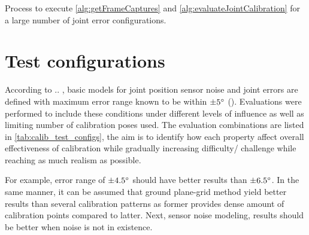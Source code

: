 \documentclass[english, printversion, nomenclature, notitle]{tuvisionthesis} %
\makeatletter
\renewcommand{\todo}[2][]{\tikzexternaldisable\@todo[#1]{#2}\tikzexternalenable}
\makeatother
\begin{document}
\begin{algorithm}[H]
	\caption{Process to execute \cref{alg:getFrameCaptures} and \cref{alg:evaluateJointCalibration} for a large number of joint error configurations.}	\label{alg:EvaluateCalibrationPoses}
	\BlankLine
\end{algorithm}

\section{Test configurations}

According to .. , basic models for joint position sensor noise and joint errors are defined with maximum error range known to be within $\pm5\degree$ (\todo{cite bhuman paper}). Evaluations were performed to include these conditions under different levels of influence as well as limiting number of calibration poses used. The evaluation combinations are listed in \cref{tab:calib_test_configs}, the aim is to identify how each property affect overall effectiveness of calibration while gradually increasing difficulty/ challenge while reaching as much realism as possible.

For example, error range of $\pm 4.5\degree$ should have better results than $\pm 6.5\degree$. In the same manner, it can be assumed that ground plane-grid method yield better results than several calibration patterns as former provides dense amount of calibration points compared to latter. Next, sensor noise modeling, results should be better when noise is not in existence. 
\end{document}
